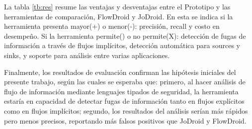 La tabla \ref{tb:res} resume las ventajas y desventajas entre el
Prototipo y las herramientas de comparación, FlowDroid y JoDroid. En esta se
indica si la herramienta presenta mayor(+) o menor(-): precisión, recall y costo
en desempeño. Si la herramienta permite(\checkmark) o no permite(X): detección
de fugas de información a través de flujos implícitos, detección automática para
sources y sinks, y soporte para análisis entre varias aplicaciones.\newline
\begin{table}[t]
\begin{center}
\small
{}
\end{center}
\caption{Síntesis ventajas y desventajas del Prototipo frente a FlowDroid y
JoDroid,respectivamente.}
\label{tb:res}
\end{table}

Finalmente, los resultados de evaluación confirman las hipótesis iniciales
del presente trabajo, según las cuales se esperaba que: primero, al hacer análisis
de flujo de información mediante lenguajes tipados de seguridad, la herramienta estaría en
capacidad de detectar fugas de información tanto en flujos explícitos como en
flujos implícitos; segundo, los resultados del análisis serían más rápidos pero
menos precisos, reportando más falsos positivos que JoDroid y FlowDroid.\newline